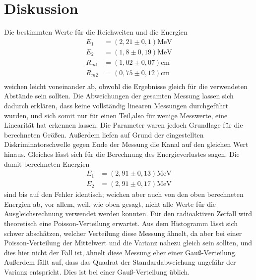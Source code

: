 \section{Diskussion}
\label{sec:Diskussion}

Die bestimmten Werte für die Reichweiten und die Energien
\begin{align*}
E_{1} &= (2,21 \pm 0,1) \si{\MeV}\\
E_{2} &= (1,8 \pm 0,19) \si{\MeV}\\
R_{m1} &= (1,02 \pm 0,07) \si{\centi\meter}\\
R_{m2} &= (0,75 \pm 0,12) \si{\centi\meter}\\
\end{align*}
weichen leicht voneinander ab, obwohl die Ergebnisse gleich für die verwendeten Abstände sein sollten.
Die Abweichungen der gesamten Messung lassen sich dadurch erklären, dass keine vollständig linearen Messungen durchgeführt wurden,
und sich somit nur für einen Teil,also für wenige Messwerte, eine Linearität hat erkennen lassen. Die Parameter waren jedoch Grundlage für die berechneten Größen.
Außerdem liefen auf Grund der eingestellten Diskriminatorschwelle gegen Ende der Messung die Kanal auf den gleichen Wert hinaus.
Gleiches lässt sich für die Berechnung des Energieverlustes sagen. Die damit berechneten Energien
\begin{align*}
E_1 &= (2,91 \pm 0,13) \si{\MeV}\\
E_2 &= (2,91 \pm 0,17) \si{\MeV}
\end{align*}
sind bis auf den Fehler identisch; weichen aber auch von den oben berechneten Energien ab, vor allem, weil, wie oben gesagt, nicht alle Werte für die Ausgleichsrechnung verwendet werden konnten. 
\noindent Für den radioaktiven Zerfall wird theoretisch eine Poisson-Verteilung erwartet. Aus dem Histogramm lässt sich schwer abschätzen, welcher Verteilung diese Messung ähnelt,
da aber bei einer Poisson-Verteilung der Mittelwert und die Varianz nahezu gleich sein sollten, und dies hier nicht der Fall ist, ähnelt diese Messung eher einer Gauß-Verteilung. 
Außerdem fällt auf, dass das Quadrat der Standardabweichung ungefähr der Varianz entspricht. Dies ist bei einer Gauß-Verteilung üblich.
